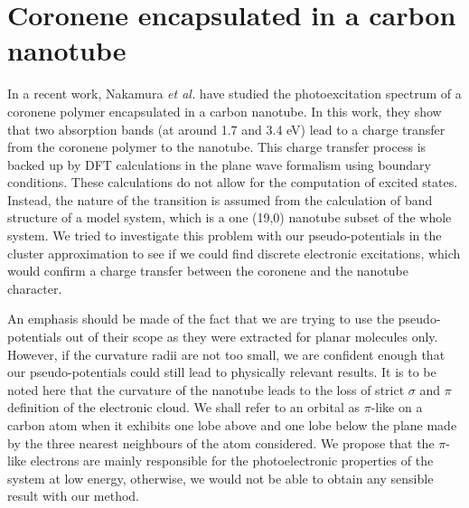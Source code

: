 \documentclass[12pt]{article}
\begin{document}
\section*{\sffamily \large Coronene encapsulated in a carbon nanotube}	
In a recent work, Nakamura \emph{et al.} have studied the photoexcitation	
spectrum of a coronene polymer encapsulated in a carbon nanotube.\cite{nakamura2018}	
In this work, they show that two absorption bands (at around 1.7 and 3.4 eV)	
lead to a charge transfer from the coronene polymer to the nanotube.	
This charge transfer process is backed up by DFT calculations in the plane wave formalism	
using boundary conditions.	
These calculations do not allow for the computation of excited states.	
Instead, the nature of the transition is assumed from the calculation of band structure	
of a model system, which is a one (19,0) nanotube subset of the whole system.	
We tried to investigate this problem with our pseudo-potentials in the cluster approximation	
to see if we could find discrete electronic excitations, which would confirm a charge transfer	
between the coronene and the nanotube character.	

 An emphasis should be made of the fact that we are trying to use the pseudo-potentials	
out of their scope as they were extracted for planar molecules only.	
However, if the curvature radii are not too small, we are confident enough that our	
pseudo-potentials could still lead to physically relevant results.	
It is to be noted here that the curvature of the nanotube leads to the loss of strict	
$\sigma$ and $\pi$ definition of the electronic cloud.	
We shall refer to an orbital as $\pi$-like on a carbon atom when it exhibits	
one lobe above and one lobe below	
the plane made by the three nearest neighbours of the atom considered.	
We propose that the $\pi$-like electrons are mainly responsible for the	
photoelectronic properties of the system at low energy, otherwise, we would not be able to	
obtain any sensible result with our method.	
\end{document}
